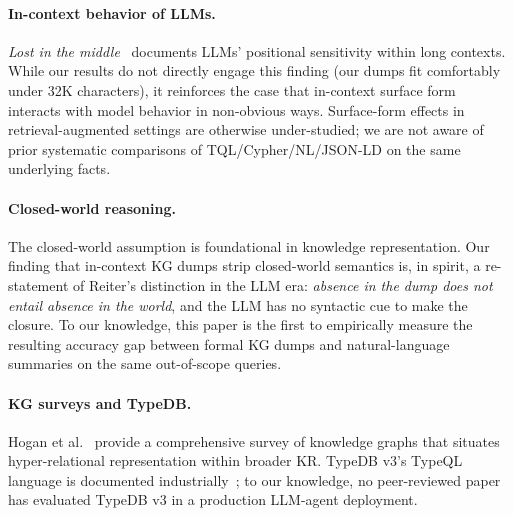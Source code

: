 \paragraph{In-context behavior of LLMs.}
\emph{Lost in the middle}~\citep{liu2023lostmiddle} documents
LLMs' positional sensitivity within long contexts. While our
results do not directly engage this finding (our dumps fit
comfortably under 32K characters), it reinforces the case that
in-context surface form interacts with model behavior in
non-obvious ways. Surface-form effects in retrieval-augmented
settings are otherwise under-studied; we are not aware of prior
systematic comparisons of TQL/Cypher/NL/JSON-LD on the same
underlying facts.

\paragraph{Closed-world reasoning.}
The closed-world assumption \citep{reiter1978cwa} is foundational
in knowledge representation. Our finding that in-context KG dumps
strip closed-world semantics is, in spirit, a re-statement of
Reiter's distinction in the LLM era: \emph{absence in the dump
does not entail absence in the world}, and the LLM has no syntactic
cue to make the closure. To our knowledge, this paper is the first
to empirically measure the resulting accuracy gap between formal
KG dumps and natural-language summaries on the same out-of-scope
queries.

\paragraph{KG surveys and TypeDB.}
Hogan et al.~\citep{hogan2021kgsurvey} provide a comprehensive
survey of knowledge graphs that situates hyper-relational
representation within broader KR. TypeDB v3's TypeQL language is
documented industrially~\citep{vaticle2023typeql}; to our
knowledge, no peer-reviewed paper has evaluated TypeDB v3 in a
production LLM-agent deployment.
